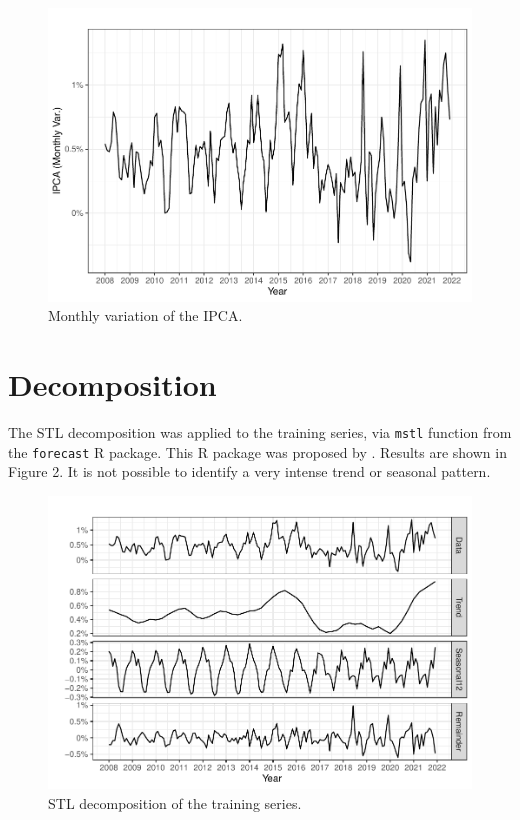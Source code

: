 \documentclass{statsoc}
\begin{document}
\begin{figure}

{\centering \includegraphics[height=0.4\textheight]{Trabalho_2_article_files/figure-latex/ipca-plot-1} 

}

\caption{Monthly variation of the IPCA.}\label{fig:ipca-plot}
\end{figure}

\hypertarget{decomposition}{%
\section{Decomposition}\label{decomposition}}

The STL decomposition was applied to the training series, via
\texttt{mstl} function from the \texttt{forecast} R package. This R
package was proposed by \citet{forecast}. Results are shown in Figure 2.
It is not possible to identify a very intense trend or seasonal pattern.

\begin{figure}

{\centering \includegraphics[height=0.4\textheight]{Trabalho_2_article_files/figure-latex/mstl-1} 

}

\caption{STL decomposition of the training series.}\label{fig:mstl}
\end{figure}
\end{document}
